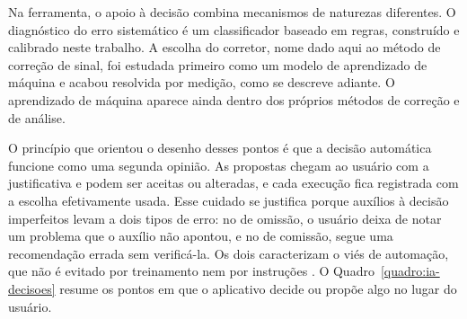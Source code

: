 Na ferramenta, o apoio à decisão combina mecanismos de naturezas diferentes. O diagnóstico do erro sistemático é um classificador baseado em regras, construído e calibrado neste trabalho. A escolha do corretor, nome dado aqui ao método de correção de sinal, foi estudada primeiro como um modelo de aprendizado de máquina e acabou resolvida por medição, como se descreve adiante. O aprendizado de máquina aparece ainda dentro dos próprios métodos de correção e de análise.

O princípio que orientou o desenho desses pontos é que a decisão automática funcione como uma segunda opinião. As propostas chegam ao usuário com a justificativa e podem ser aceitas ou alteradas, e cada execução fica registrada com a escolha efetivamente usada. Esse cuidado se justifica porque auxílios à decisão imperfeitos levam a dois tipos de erro: no de omissão, o usuário deixa de notar um problema que o auxílio não apontou, e no de comissão, segue uma recomendação errada sem verificá-la. Os dois caracterizam o viés de automação, que não é evitado por treinamento nem por instruções \cite{parasuraman2010complacency}. O Quadro~\ref{quadro:ia-decisoes} resume os pontos em que o aplicativo decide ou propõe algo no lugar do usuário.

